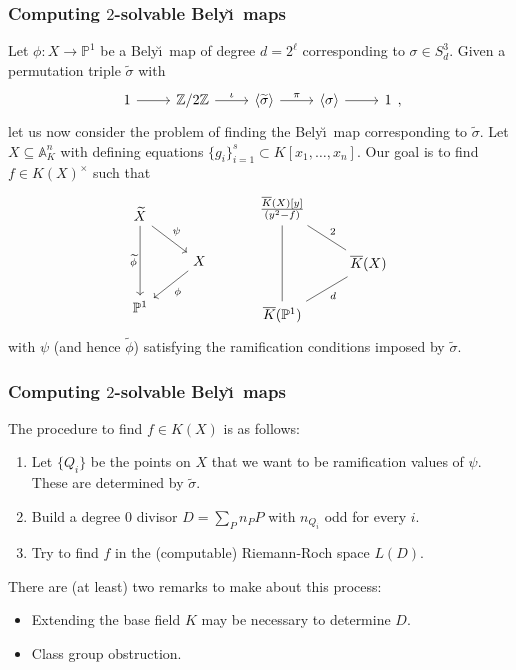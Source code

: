 \documentclass[xcolor=dvipsnames]{beamer}
\theoremstyle{plain}
\newcommand{\A}{\mathbb A}
\newcommand{\PP}{\mathbb P}
\newcommand{\Z}{\mathbb{Z}}
\newcommand{\wt}[1]{\widetilde{#1}}
\newcommand{\Belyi}{Bely\u{\i}}
\begin{document}
  \begin{frame}[plain]
    \frametitle{Computing $2$-solvable \Belyi\ maps}
    \pause
    Let $\phi:X\to\PP^1$ be a \Belyi\ map
    of degree $d = 2^\ell$
    corresponding
    \newline
    to $\sigma\in S_d^3$.
    \pause
    Given a permutation triple $\wt{\sigma}$ with
    \[
      \begin{tikzcd}[ampersand replacement=\&, row sep = small]
        1\arrow{r}\&\Z/2\Z\arrow{r}{\iota}\&\langle\widetilde{\sigma}\rangle\arrow{r}{\pi}\&\langle\sigma\rangle\arrow{r}\&1
      \end{tikzcd},
    \]
    \pause
    let us now consider the problem of finding the \Belyi\ map
    corresponding to $\wt{\sigma}$.
    \pause
    Let $X\subseteq\A_K^n$ with defining equations
    $\{g_i\}_{i=1}^s\subset K[x_1,\dots,x_n]$.
    \pause
    Our goal is to find $f\in K(X)^\times$ such that
    \pause
    \[
      \begin{tikzcd}[ampersand replacement=\&]
        \widetilde{X}\arrow{dd}[swap]{\widetilde{\phi}}\arrow{dr}{\psi}\\
        \&X\arrow{dl}{\phi}\\
        \PP^1
      \end{tikzcd}
      \quad
      \quad
      \quad
      \begin{tikzcd}[ampersand replacement=\&]
        \frac{\overline{K}(X)[y]}{(y^2-f)}\arrow[dash]{dd}\arrow[dash]{dr}{2}\\
        \&\overline{K}(X)\arrow[dash]{dl}{d}\\
        \overline{K}(\PP^1)
      \end{tikzcd}
    \]
    \pause
    with $\psi$ (and hence $\wt{\phi}$) satisfying the ramification conditions imposed by
    $\wt{\sigma}$.
  \end{frame}
  \begin{frame}[plain]
    \frametitle{Computing $2$-solvable \Belyi\ maps}
    \pause
    The procedure to find $f\in K(X)$ is as follows:
    \begin{enumerate}
      \pause
      \item
        Let $\{Q_i\}$ be the points on $X$ that we want to
        be ramification values of $\psi$.
        \pause
        These are determined by $\wt{\sigma}$.
      \pause
      \item
        Build a degree $0$ divisor $D = \sum_{P} n_P P$
        with $n_{Q_i}$ odd for every $i$.
      \pause
      \item
        Try to find $f$ in the (computable) Riemann-Roch space $L(D)$.
    \end{enumerate}
    \pause
    There are (at least) two remarks to make about this process:
    \pause
    \begin{itemize}
      \item
        Extending the base field  $K$ may be necessary
        to determine $D$.
      \item
      \pause
        Class group obstruction.
    \end{itemize}
  \end{frame}
\end{document}
